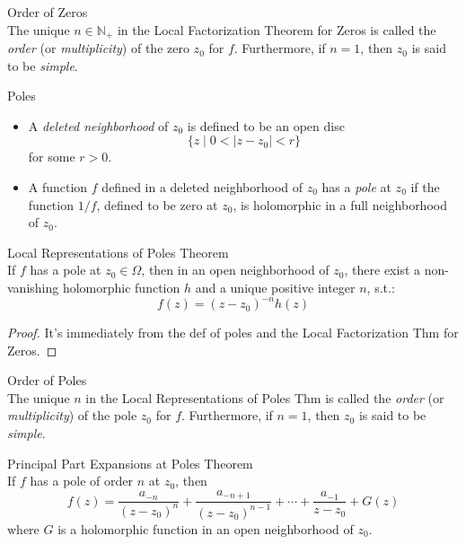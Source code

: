 \begin{definition}{Order of Zeros}\\
The unique $n\in \mathbb{N}_+$ in the Local Factorization Theorem for Zeros is called the \textit{order} (or \textit{multiplicity}) of the zero $z_0$ for $f$. Furthermore, if $n=1$, then $z_0$ is said to be \textit{simple}.
\end{definition}

\begin{definition}{Poles}
\begin{itemize}
    \item A \textit{deleted neighborhood} of $z_0$ is defined to be an open disc
    \[
    \{z\mid 0<|z-z_0|<r\}
    \]
    for some $r>0$.

    \item A function $f$ defined in a deleted neighborhood of $z_0$ has a \textit{pole} at $z_0$ if the function $1/f$, defined to be zero at $z_0$, is holomorphic in a full neighborhood of $z_0$.
\end{itemize}
\end{definition}

\begin{theorem}{Local Representations of Poles Theorem}\\
If $f$ has a pole at $z_0 \in \Omega$, then in an open neighborhood of $z_0$, there exist a non-vanishing holomorphic function $h$ and a unique positive integer $n$, s.t.:
\[
f(z)= (z-z_0)^{-n} h(z)
\]
\end{theorem}

\begin{proof}
    It's immediately from the def of poles and the Local Factorization Thm for Zeros.
\end{proof}

\begin{definition}{Order of Poles}\\
The unique $n$ in the Local Representations of Poles Thm is called the \textit{order} (or \textit{multiplicity}) of the pole $z_0$ for $f$. Furthermore, if $n=1$, then $z_0$ is said to be \textit{simple}.
\end{definition}

\begin{theorem}{Principal Part Expansions at Poles Theorem}\\
If $f$ has a pole of order $n$ at $z_0$, then
\[
f(z)= \frac{a_{-n}}{(z-z_0)^n} +\frac{a_{-n+1}}{(z-z_0)^{n-1}} +\cdots+ \frac{a_{-1}}{z-z_0} +G(z)
\]
where $G$ is a holomorphic function in an open neighborhood of $z_0$.
\end{theorem}

